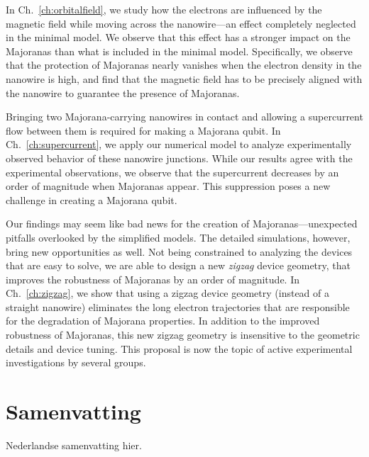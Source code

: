 In Ch.~\ref{ch:orbitalfield}, we study how the electrons are influenced by the magnetic field while moving across the nanowire---an effect completely neglected in the minimal model.
We observe that this effect has a stronger impact on the Majoranas than what is included in the minimal model.
Specifically, we observe that the protection of Majoranas nearly vanishes when the electron density in the nanowire is high, and find that the magnetic field has to be precisely aligned with the nanowire to guarantee the presence of Majoranas.

Bringing two Majorana-carrying nanowires in contact and allowing a supercurrent flow between them is required for making a Majorana qubit.
In Ch.~\ref{ch:supercurrent}, we apply our numerical model to analyze experimentally observed behavior of these nanowire junctions.
While our results agree with the experimental observations, we observe that the supercurrent decreases by an order of magnitude when Majoranas appear.
This suppression poses a new challenge in creating a Majorana qubit.

Our findings may seem like bad news for the creation of Majoranas---unexpected pitfalls overlooked by the simplified models.
The detailed simulations, however, bring new opportunities as well.
Not being constrained to analyzing the devices that are easy to solve, we are able to design a new \emph{zigzag} device geometry, that improves the robustness of Majoranas by an order of magnitude.
In Ch.~\ref{ch:zigzag}, we show that using a zigzag device geometry (instead of a straight nanowire) eliminates the long electron trajectories that are responsible for the degradation of Majorana properties.
In addition to the improved robustness of Majoranas, this new zigzag geometry is insensitive to the geometric details and device tuning.
This proposal is now the topic of active experimental investigations by several groups.

\chapter*{Samenvatting}
{

Nederlandse samenvatting hier.

}